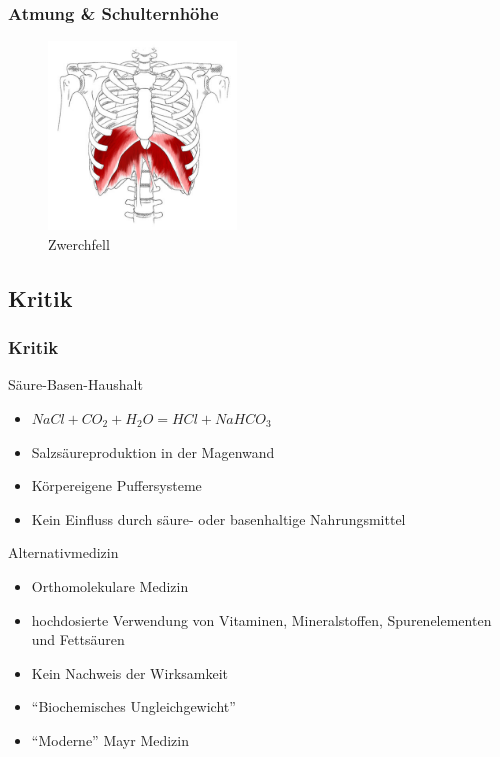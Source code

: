 \documentclass[xcolor=dvipsnames]{beamer}
\begin{document}
    \begin{frame}
        \frametitle{Atmung \& Schulternhöhe}

        \begin{figure}
            \includegraphics[width=5cm]{../images/therapie_1.jpg}
            \caption{Zwerchfell}
        \end{figure}
    \end{frame}

    \subsection{Kritik}
    \begin{frame}[allowframebreaks]
        \frametitle{Kritik}

        \begin{block}{Säure-Basen-Haushalt}
            \begin{itemize}
                \setlength\itemsep{1em}
                \item $NaCl + CO_{2} + H_{2}O = HCl + NaHCO_3$
                \item Salzsäureproduktion in der Magenwand
                \item Körpereigene Puffersysteme
                \item Kein Einfluss durch säure- oder basenhaltige Nahrungsmittel
            \end{itemize}
        \end{block}

        \begin{block}{Alternativmedizin}
            \begin{itemize}
                \setlength\itemsep{1em}
                \item Orthomolekulare Medizin
                \item hochdosierte Verwendung von Vitaminen, Mineralstoffen, Spurenelementen und Fettsäuren
                \item Kein Nachweis der Wirksamkeit
                \item "`Biochemisches Ungleichgewicht"'
                \item "`Moderne"' Mayr Medizin
            \end{itemize}
        \end{block}
    \end{frame}
\end{document}
